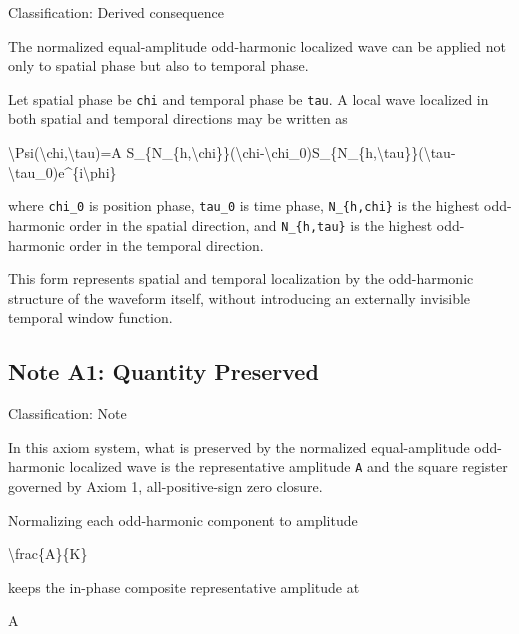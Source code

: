 \documentclass[
  a4paper,
]{article}
\newenvironment{Shaded}{}{}
\newcommand{\NormalTok}[1]{#1}
\begin{document}
Classification: Derived consequence

The normalized equal-amplitude odd-harmonic localized wave can be
applied not only to spatial phase but also to temporal phase.

Let spatial phase be \texttt{chi} and temporal phase be \texttt{tau}. A
local wave localized in both spatial and temporal directions may be
written as

\begin{Shaded}
\begin{Highlighting}[]
\NormalTok{\textbackslash{}Psi(\textbackslash{}chi,\textbackslash{}tau)=A S\_\{N\_\{h,\textbackslash{}chi\}\}(\textbackslash{}chi{-}\textbackslash{}chi\_0)S\_\{N\_\{h,\textbackslash{}tau\}\}(\textbackslash{}tau{-}\textbackslash{}tau\_0)e\^{}\{i\textbackslash{}phi\}}
\end{Highlighting}
\end{Shaded}

where \texttt{chi\_0} is position phase, \texttt{tau\_0} is time phase,
\texttt{N\_\{h,chi\}} is the highest odd-harmonic order in the spatial
direction, and \texttt{N\_\{h,tau\}} is the highest odd-harmonic order
in the temporal direction.

This form represents spatial and temporal localization by the
odd-harmonic structure of the waveform itself, without introducing an
externally invisible temporal window function.

\subsection{Note A1: Quantity
Preserved}\label{note-a1-quantity-preserved}

Classification: Note

In this axiom system, what is preserved by the normalized
equal-amplitude odd-harmonic localized wave is the representative
amplitude \texttt{A} and the square register governed by Axiom 1,
all-positive-sign zero closure.

Normalizing each odd-harmonic component to amplitude

\begin{Shaded}
\begin{Highlighting}[]
\NormalTok{\textbackslash{}frac\{A\}\{K\}}
\end{Highlighting}
\end{Shaded}

keeps the in-phase composite representative amplitude at

\begin{Shaded}
\begin{Highlighting}[]
\NormalTok{A}
\end{Highlighting}
\end{Shaded}
\end{document}
